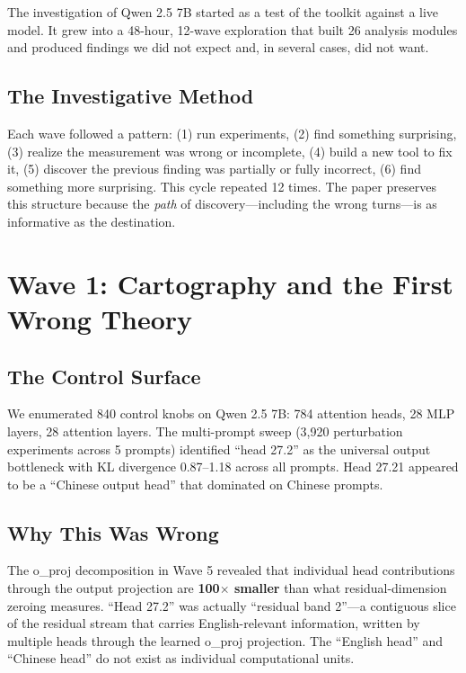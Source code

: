 \documentclass[11pt,a4paper]{article}
\begin{document}
The investigation of Qwen 2.5 7B started as a test of the toolkit against a live model. It grew into a 48-hour, 12-wave exploration that built 26 analysis modules and produced findings we did not expect and, in several cases, did not want.

\subsection{The Investigative Method}
Each wave followed a pattern: (1) run experiments, (2) find something surprising, (3) realize the measurement was wrong or incomplete, (4) build a new tool to fix it, (5) discover the previous finding was partially or fully incorrect, (6) find something more surprising. This cycle repeated 12 times. The paper preserves this structure because the \textit{path} of discovery---including the wrong turns---is as informative as the destination.

\section{Wave 1: Cartography and the First Wrong Theory}

\subsection{The Control Surface}
We enumerated 840 control knobs on Qwen 2.5 7B: 784 attention heads, 28 MLP layers, 28 attention layers. The multi-prompt sweep (3,920 perturbation experiments across 5 prompts) identified ``head 27.2'' as the universal output bottleneck with KL divergence 0.87--1.18 across all prompts. Head 27.21 appeared to be a ``Chinese output head'' that dominated on Chinese prompts.

\subsection{Why This Was Wrong}
The o\_proj decomposition in Wave 5 revealed that individual head contributions through the output projection are \textbf{100$\times$ smaller} than what residual-dimension zeroing measures. ``Head 27.2'' was actually ``residual band 2''---a contiguous slice of the residual stream that carries English-relevant information, written by multiple heads through the learned o\_proj projection. The ``English head'' and ``Chinese head'' do not exist as individual computational units.
\end{document}

